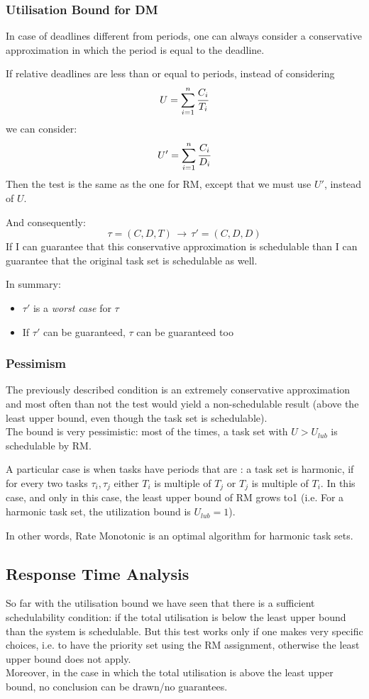 \subsubsection{Utilisation Bound for DM}
In case of deadlines different from periods, one can always consider a conservative approximation in which the period is equal to the deadline. 

If relative deadlines are less than or equal to periods, instead of considering 
\[U = \sum_{i=1}^n \cfrac{C_i}{T_i}\]
we can consider:
\[U' = \sum_{i=1}^n \cfrac{C_i}{D_i}\]
Then the test is the same as the one for RM, except that we must use $U'$, instead of $U$.

And consequently:
\[\tau = (C,D,T)\,\rightarrow\,\tau' = (C,D,D)\]
If I can guarantee that this conservative approximation is schedulable than I can guarantee that the original task set is schedulable as well.

In summary:
\begin{itemize}
\item $\tau'$ is a \emph{worst case} for $\tau$
\item If $\tau'$ can be guaranteed, $\tau$ can be guaranteed too
\end{itemize}

\subsubsection{Pessimism}

The previously described condition is an extremely conservative approximation and most often than not the test would yield a non-schedulable result (above the least upper bound, even though the task set is schedulable).\\
The bound is very pessimistic: most of the times, a task set with $U > U_{lub}$ is schedulable by RM.

A particular case is when tasks have periods that are : a task set is harmonic, if for every two tasks $\tau_i, \tau_j$ either $T_i$ is multiple of $T_j$ or $T_j$ is multiple of $T_i$. In this case, and only in this case, the least upper bound of RM grows to1 (i.e. For a harmonic task set, the utilization bound is $U_{lub} = 1$).

In other words, Rate Monotonic is an optimal algorithm for harmonic task sets.

\subsection{Response Time Analysis}
So far with the utilisation bound we have seen that there is a sufficient schedulability condition: if the total utilisation is below the least upper bound than the system is schedulable. But this test works only if one makes very specific choices, i.e. to have the priority set using the RM assignment, otherwise the least upper bound does not apply.\\
Moreover, in the case in which the total utilisation is above the least upper bound, no conclusion can be drawn/no guarantees.

